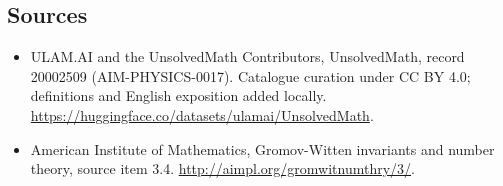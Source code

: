 \documentclass[11pt]{article}
\begin{document}
\subsection{Sources}
\begin{itemize}
\item[\hypertarget{source:20002509:1}{S1}] ULAM.AI and the UnsolvedMath Contributors, UnsolvedMath, record 20002509 (AIM-PHYSICS-0017). Catalogue curation under CC BY 4.0; definitions and English exposition added locally.
\url{https://huggingface.co/datasets/ulamai/UnsolvedMath}.
\item[\hypertarget{source:20002509:2}{S2}] American Institute of Mathematics, Gromov-Witten invariants and number theory, source item 3.4.
\url{http://aimpl.org/gromwitnumthry/3/}.
\end{itemize}
\label{end:20002509}
\end{document}
